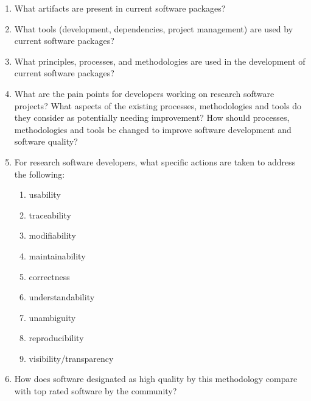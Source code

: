 \documentclass[letterpaper,cleveref]{lipics-v2019}
\theoremstyle{definition}
\begin{document}
\begin{enumerate}
\item What artifacts are present in current software packages? 
\item What tools (development, dependencies, project management) are used by current software packages?
\item What principles, processes, and methodologies are used in the development
  of current software packages?
\item What are the pain points for developers working on research software
  projects?  What aspects of the existing processes, methodologies and tools do
  they consider as potentially needing improvement?  How should processes,
  methodologies and tools be changed to improve software development and
  software quality?
\item For research software developers, what specific actions are taken to
  address the following:
\begin{enumerate}
\item usability
\item traceability
\item modifiability
\item maintainability
\item correctness
\item understandability
\item unambiguity
\item reproducibility
\item visibility/transparency
\end{enumerate} 
\item How does software designated as high quality by this methodology compare
  with top rated software by the community?
\end{enumerate}
\end{document}
